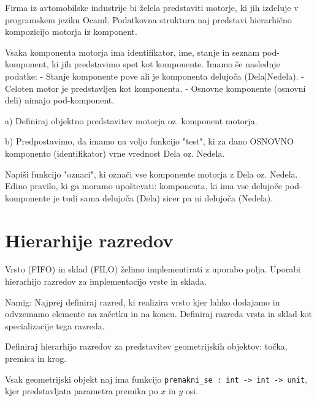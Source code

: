\begin{ex}
Firma iz avtomobilske industrije bi \v zelela predstaviti motorje, ki jih izdeluje v programskem jeziku Ocaml. Podatkovna struktura naj predstavi hierarhi\v cno kompozicijo motorja iz komponent. 

Vsaka komponenta motorja ima identifikator, ime, stanje in seznam pod-komponent, ki jih predstavimo spet kot komponente. Imamo \v se naslednje podatke:
- Stanje komponente pove ali je komponenta delujo\v ca (Dela|Nedela). 
- Celoten motor je predstavljen kot komponenta. 
- Osnovne komponente (osnovni deli) nimajo pod-komponent.

a) Definiraj objektno predstavitev motorja oz. komponent motorja.

b) Predpostavimo, da imamo na voljo funkcijo "test", ki za dano OSNOVNO komponento (identifikator) vrne  vrednost Dela oz. Nedela. 

Napi\v si funkcijo "oznaci", ki ozna\v ci vse komponente motorja z Dela oz. Nedela. Edino pravilo, ki ga moramo upo\v stevati: komponenta, ki ima vse delujo\v ce pod-komponente je tudi sama delujo\v ca (Dela) sicer pa ni delujo\v ca (Nedela). 





\section{Hierarhije razredov}


\end{ex}
\begin{ex}
Vrsto (FIFO) in sklad (FILO) \v zelimo implementirati z uporabo polja. Uporabi hierarhijo razredov za implementacijo vrste in sklada. 

Namig: Najprej definiraj razred, ki realizira vrsto kjer lahko dodajamo in odvzemamo elemente na za\v cetku in na koncu. Definiraj razreda vrsta in sklad kot specializacije tega razreda.



\end{ex}
\begin{ex}
Definiraj hierarhijo razredov za predstavitev geometrijskih objektov: to\v cka, premica in krog. 

Vsak geometrijski objekt naj ima funkcijo \texttt{premakni\_se : int -> int -> unit}, kjer predstavljata parametra premika po $x$ in $y$ osi. 

\end{ex}
